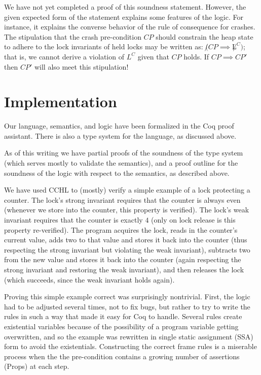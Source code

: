We have not yet completed a proof of this soundness statement.
However, the given expected form of the statement explains some features
of the logic.
For instance, it explains the converse behavior of the rule of consequence for
crashes.
The stipulation that the crash pre-condition $CP$
should constrain the heap state to adhere to the lock invariants of held locks
may be written as: $\not (CP \implies \not L^C)$;
that is, we cannot derive a violation of $L^C$ given that $CP$ holds.
If $CP \implies CP'$ then $CP'$ will also meet this stipulation!

\section{Implementation}
\label{sec:imp}

Our language, semantics, and logic have been formalized in the Coq
proof assistant.
There is also a type system for the language, as discussed above.

As of this writing we have partial proofs of the soundness of the type system
(which serves mostly to validate the semantics), and a proof outline for the
soundness of the logic with respect to the semantics, as described above.

We have used CCHL to (mostly) verify a simple example of a lock protecting a
counter.  The lock's strong invariant requires that the counter is always even
(whenever we store into the counter, this property is verified). The lock's weak
invariant requires that the counter is exactly $4$ (only on lock release is this
property re-verified). The program acquires the lock, reads in the counter's
current value, adds two to that value and stores it back into the counter (thus
respecting the strong invariant but violating the weak invariant), subtracts two
from the new value and stores it back into the counter (again respecting the
strong invariant and restoring the weak invariant), and then releases the lock
(which succeeds, since the weak invariant holds again).

Proving this simple example correct was surprisingly nontrivial. First, the
logic had to be adjusted several times, not to fix bugs, but rather to try to
write the rules in such a way that made it easy for Coq to handle. Several rules
create existential variables because of the possibility of a program variable
getting overwritten, and so the example was rewritten in single static
assignment (SSA) form to avoid the existentials. Constructing the correct frame
rules is a miserable process when the the pre-condition contains a growing
number of assertions (Props) at each step.

